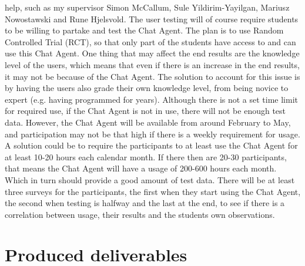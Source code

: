 help, such as my supervisor Simon McCallum, Sule Yildirim-Yayilgan, Mariusz Nowostawski and Rune Hjelsvold. 
\vspace{0.5em}\newline
The user testing will of course require students to be willing to partake and test the Chat Agent. The plan is to use Random Controlled Trial (RCT), so that only part of the students 
have access to and 
can use this Chat Agent. One thing that may affect the end results are the knowledge level of the users, which means that even if there is an increase in the end results, it may not 
be because of the Chat Agent. The solution to account for this issue is by having the users also grade their own knowledge level, from being novice to expert (e.g. having programmed 
for years). Although there is not a set time limit for required use, if the Chat Agent is not in use, there will not be enough test data. However, the Chat Agent will be available from 
around February to May, and participation may not be that high if there is a weekly requirement for usage. A solution could be to require the participants to at least use the Chat Agent 
for at least 10-20 hours each calendar month. If there then are 20-30 participants, that means the Chat Agent will have a usage of 200-600 hours each month. Which in turn should provide 
a good amount of test data. There will be at least three surveys for the participants, the first when they start using the Chat Agent, the second when testing is halfway and the last 
at the end, to see if there is a correlation between usage, their results and the students own observations.

\section{Produced deliverables}
\label{chapter5:produced_deliverables}

